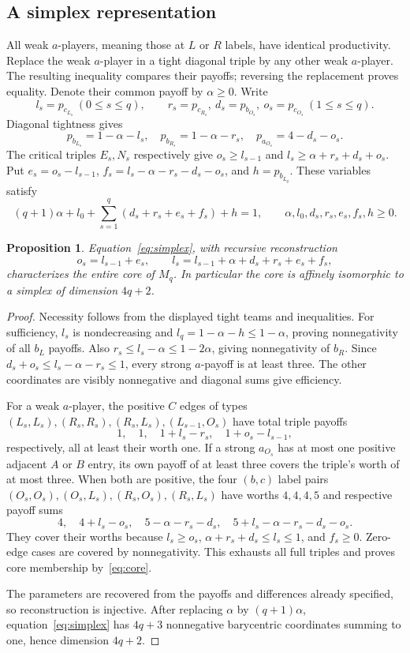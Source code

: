 \documentclass[11pt]{article}
\newtheorem{proposition}[theorem]{Proposition}
\theoremstyle{remark}\newtheorem{remark}[theorem]{Remark}
\begin{document}
\subsection{A simplex representation}
All weak $a$-players, meaning those at $L$ or $R$ labels, have identical
productivity. Replace the weak $a$-player in a tight diagonal triple by any
other weak $a$-player. The resulting inequality compares their payoffs;
reversing the replacement proves equality. Denote their common payoff by
$\alpha\ge0$. Write
\[
 l_s=p_{c_{L_s}}\ (0\le s\le q),\qquad
 r_s=p_{c_{R_s}},\ d_s=p_{b_{O_s}},\ o_s=p_{c_{O_s}}\ (1\le s\le q).
\]
Diagonal tightness gives
\[
 p_{b_{L_s}}=1-\alpha-l_s,\quad p_{b_{R_s}}=1-\alpha-r_s,\quad
 p_{a_{O_s}}=4-d_s-o_s.
\]
The critical triples $E_s,N_s$ respectively give
$o_s\ge l_{s-1}$ and $l_s\ge\alpha+r_s+d_s+o_s$.
Put $e_s=o_s-l_{s-1}$, $f_s=l_s-\alpha-r_s-d_s-o_s$, and
$h=p_{b_{L_q}}$. These variables satisfy
\begin{equation}\label{eq:simplex}
 (q+1)\alpha+l_0+\sum_{s=1}^q(d_s+r_s+e_s+f_s)+h=1,
 \qquad \alpha,l_0,d_s,r_s,e_s,f_s,h\ge0.
\end{equation}

\begin{proposition}\label{prop:simplex}
Equation~\eqref{eq:simplex}, with recursive reconstruction
\[
 o_s=l_{s-1}+e_s,\qquad
 l_s=l_{s-1}+\alpha+d_s+r_s+e_s+f_s,
\]
characterizes the entire core of $M_q$. In particular the core is affinely
isomorphic to a simplex of dimension $4q+2$.
\end{proposition}
\begin{proof}
Necessity follows from the displayed tight teams and inequalities.
For sufficiency, $l_s$ is nondecreasing and
$l_q=1-\alpha-h\le1-\alpha$, proving nonnegativity of all $b_L$ payoffs.
Also $r_s\le l_s-\alpha\le1-2\alpha$, giving nonnegativity of $b_R$.
Since $d_s+o_s\le l_s-\alpha-r_s\le1$, every strong $a$-payoff is at least
three. The other coordinates are visibly nonnegative and diagonal sums give
efficiency.

For a weak $a$-player, the positive $C$ edges of types
$(L_s,L_s),(R_s,R_s),(R_s,L_s),(L_{s-1},O_s)$ have total triple payoffs
\[
 1,\quad1,\quad1+l_s-r_s,\quad1+o_s-l_{s-1},
\]
respectively, all at least their worth one. If a strong $a_{O_s}$ has at
most one positive adjacent $A$ or $B$ entry, its own payoff of at least
three covers the triple's worth of at most three. When both are positive,
the four $(b,c)$ label pairs $(O_s,O_s),(O_s,L_s),(R_s,O_s),(R_s,L_s)$
have worths $4,4,4,5$ and respective payoff sums
\[
 4,\quad4+l_s-o_s,\quad5-\alpha-r_s-d_s,
 \quad5+l_s-\alpha-r_s-d_s-o_s.
\]
They cover their worths because $l_s\ge o_s$,
$\alpha+r_s+d_s\le l_s\le1$, and $f_s\ge0$. Zero-edge cases are
covered by nonnegativity. This exhausts all full triples and proves core
membership by~\eqref{eq:core}.

The parameters are recovered from the payoffs and differences already
specified, so reconstruction is injective. After replacing $\alpha$ by
$(q+1)\alpha$, equation~\eqref{eq:simplex} has $4q+3$ nonnegative
barycentric coordinates summing to one, hence dimension $4q+2$.
\end{proof}
\end{document}

